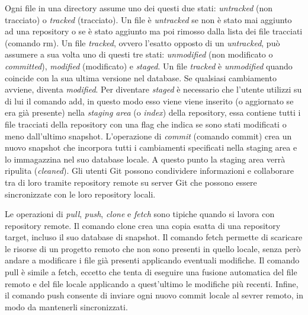 Ogni file in una directory assume uno dei questi due stati:
\emph{untracked} (non tracciato) o \emph{tracked} (tracciato).
Un file è \emph{untracked} se non è stato mai aggiunto ad una repository o se è stato
aggiunto ma poi rimosso dalla lista dei file tracciati (comando \textsf{rm}).
Un file \emph{tracked}, ovvero l'esatto opposto di un \emph{untracked}, può assumere a sua volta uno di questi tre
stati: \emph{unmodified} (non modificato o \emph{committed}), \emph{modified} (modificato) e \emph{staged}.
Un file \emph{tracked} è \emph{unmodified} quando coincide con la sua ultima versione nel database.
Se qualsiasi cambiamento avviene, diventa \emph{modified}.
Per diventare \emph{staged} è necessario che l'utente utilizzi su di lui il comando \textsf{add},
in questo modo esso viene viene inserito (o aggiornato se era già presente) nella \emph{staging area}
(o \emph{index}) della repository, essa contiene tutti i file tracciati della repository con una flag
che indica se sono stati modificati o meno dall'ultimo snapshot.
L'operazione di \emph{commit} (comando \textsf{commit}) crea un nuovo snapshot che incorpora
tutti i cambiamenti specificati nella staging area e lo immagazzina nel suo database locale.
A questo punto la staging area verrà ripulita (\emph{cleaned}).
Gli utenti Git possono condividere informazioni e collaborare tra di loro tramite repository remote
su server Git che possono essere sincronizzate con le loro repository locali.

Le operazioni di \emph{pull}, \emph{push}, \emph{clone} e \emph{fetch}
sono tipiche quando si lavora con repository remote.
Il comando \textsf{clone} crea una copia esatta di una repository target,
incluso il suo database di snapshot.
Il comando \textsf{fetch} permette di scaricare le risorse di un progetto remoto che non sono
presenti in quello locale, senza però andare a modificare i file già presenti
applicando eventuali modifiche.
Il comando \textsf{pull} è simile a \textsf{fetch}, eccetto che tenta di eseguire una fusione
automatica del file remoto e del file locale applicando a quest'ultimo le modifiche più recenti.
Infine, il comando \textsf{push} consente di inviare ogni nuovo commit locale al sevrer remoto,
in modo da mantenerli sincronizzati.


